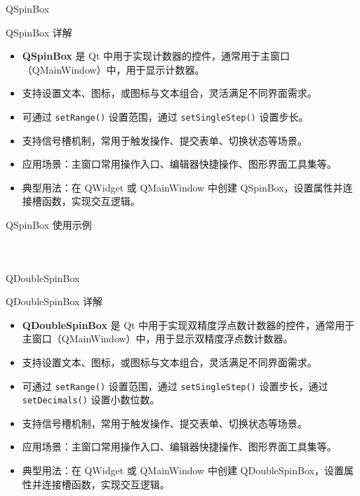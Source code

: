 \documentclass[UTF8,aspectratio=169]{beamer}
\begin{document}
\begin{frame}{QSpinBox}
    \begin{ytublock}{QSpinBox 详解}
        \begin{itemize}
            \item \textbf{QSpinBox} 是 Qt 中用于实现计数器的控件，通常用于主窗口（QMainWindow）中，用于显示计数器。
            \item 支持设置文本、图标，或图标与文本组合，灵活满足不同界面需求。
            \item 可通过 \texttt{setRange()} 设置范围，通过 \texttt{setSingleStep()} 设置步长。
            \item 支持信号槽机制，常用于触发操作、提交表单、切换状态等场景。
            \item 应用场景：主窗口常用操作入口、编辑器快捷操作、图形界面工具集等。
            \item 典型用法：在 QWidget 或 QMainWindow 中创建 QSpinBox，设置属性并连接槽函数，实现交互逻辑。
        \end{itemize}
    \end{ytublock}
\end{frame}

\begin{frame}[fragile]{QSpinBox 使用示例}
    \begin{columns}
        \begin{column}{0.48\textwidth}
            \inputminted[firstline=1,lastline=15]{cpp}{code/qt_spinbox_example.cpp}
        \end{column}
        \begin{column}{0.48\textwidth}
            \inputminted[firstline=16,lastline=31]{cpp}{code/qt_spinbox_example.cpp}
        \end{column}
    \end{columns}
\end{frame}

\begin{frame}{QDoubleSpinBox}
    \begin{ytublock}{QDoubleSpinBox 详解}
        \begin{itemize}
            \item \textbf{QDoubleSpinBox} 是 Qt 中用于实现双精度浮点数计数器的控件，通常用于主窗口（QMainWindow）中，用于显示双精度浮点数计数器。
            \item 支持设置文本、图标，或图标与文本组合，灵活满足不同界面需求。
            \item 可通过 \texttt{setRange()} 设置范围，通过 \texttt{setSingleStep()} 设置步长，通过 \texttt{setDecimals()} 设置小数位数。
            \item 支持信号槽机制，常用于触发操作、提交表单、切换状态等场景。
            \item 应用场景：主窗口常用操作入口、编辑器快捷操作、图形界面工具集等。
            \item 典型用法：在 QWidget 或 QMainWindow 中创建 QDoubleSpinBox，设置属性并连接槽函数，实现交互逻辑。
        \end{itemize}
    \end{ytublock}
\end{frame}
\end{document}
